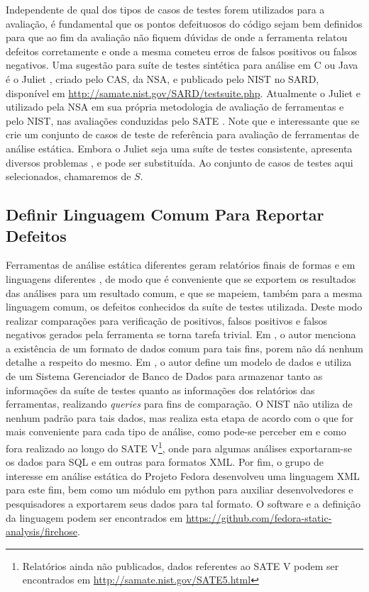 Independente de qual dos tipos de casos de testes forem utilizados para a avaliação, é fundamental que os pontos defeituosos do código sejam bem definidos para que ao fim da avaliação não fiquem dúvidas de onde a ferramenta relatou defeitos corretamente e onde a mesma cometeu erros de falsos positivos ou falsos negativos.
Uma sugestão para suíte de testes sintética para análise em C ou Java é o Juliet \cite{juliet}, criado pelo CAS, da NSA, e publicado pelo NIST no SARD, disponível em \url{http://samate.nist.gov/SARD/testsuite.php}. Atualmente o Juliet e utilizado pela NSA em sua própria metodologia de avaliação de ferramentas \cite{nsa} e pelo NIST, nas avaliações conduzidas pelo SATE \cite{sate_iv}. Note que e interessante que se crie um conjunto de casos de teste de referência para avaliação de ferramentas de análise estática. Embora o Juliet seja uma suíte de testes consistente, apresenta diversos problemas  \cite{pascal}, \cite{juliet} e pode ser substituída.
Ao conjunto de casos de testes aqui selecionados, chamaremos de $S$.

\subsection{Definir Linguagem Comum Para Reportar Defeitos}

Ferramentas de análise estática diferentes geram relatórios finais de formas e em linguagens diferentes \cite{nsa}, de modo que é conveniente que se exportem os resultados das análises para um resultado comum, e que se mapeiem, também para a mesma linguagem comum, os defeitos conhecidos da suíte de testes utilizada. Deste modo realizar comparações para verificação de positivos, falsos positivos e falsos negativos gerados pela ferramenta se torna tarefa trivial. Em \cite{nsa}, o autor menciona a existência de um formato de dados comum para tais fins, porem não dá nenhum detalhe a respeito do mesmo. Em \cite{harvard}, o autor define um modelo de dados e utiliza de um Sistema Gerenciador de Banco de Dados para armazenar tanto as informações da suíte de testes quanto as informações dos relatórios das ferramentas, realizando \textit{queries} para fins de comparação. O NIST não utiliza de nenhum padrão para tais dados, mas realiza esta etapa de acordo com o que for mais conveniente para cada tipo de análise, como pode-se perceber em \cite{sate_iv} e como fora realizado ao longo do SATE V\footnote{Relatórios ainda não publicados, dados referentes ao SATE V podem ser encontrados em \url{http://samate.nist.gov/SATE5.html}}, onde para algumas análises exportaram-se os dados para SQL e em outras para formatos XML. Por fim, o grupo de interesse em análise estática do Projeto Fedora desenvolveu uma linguagem XML para este fim, bem como um módulo em python para auxiliar desenvolvedores e pesquisadores a exportarem seus dados para tal formato. O software e a definição da linguagem podem ser encontrados em \url{https://github.com/fedora-static-analysis/firehose}.

